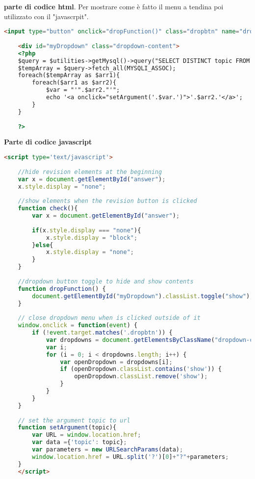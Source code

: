 \textbf{parte di codice html}. Per mostrare come è fatto il menu a tendina poi utilizzato con il "javascrpit".\\

\begin{lstlisting}[language=html]
	 <input type="button" onclick="dropFunction()" class="dropbtn" name="dropdown" value="Seleziona capitolo">
	
	<div id="myDropdown" class="dropdown-content">
	<?php
	$query = $utilities->getMysql()->query("SELECT DISTINCT topic FROM charting_test_5d");
	$tempArray = $query->fetch_all(MYSQLI_ASSOC);
	foreach($tempArray as $arr1){
		foreach($arr1 as $arr2){
			$var = "'".$arr2."'";
			echo '<a onclick="setArgument('.$var.')">'.$arr2.'</a>';
		}
	}		
	
	?>			
\end{lstlisting}

\textbf{Parte di codice javascript}\\

\begin{lstlisting}[language=html]
	<script type='text/javascript'>
	
	//hide revision elements at the beginning
	var x = document.getElementById("answer");
	x.style.display = "none";
	
	//show elements when the revision button is clicked
	function check(){
		var x = document.getElementById("answer");
		
		if(x.style.display === "none"){
			x.style.display = "block";
		}else{
			x.style.display = "none";
		}	
	}
	
	//dropdown button toggle to hide and show contents
	function dropFunction() {
		document.getElementById("myDropdown").classList.toggle("show");
	}
	
	// close dropdown menu when is clicked outside of it
	window.onclick = function(event) {
		if (!event.target.matches('.dropbtn')) {
			var dropdowns = document.getElementsByClassName("dropdown-content");
			var i;
			for (i = 0; i < dropdowns.length; i++) {
				var openDropdown = dropdowns[i];
				if (openDropdown.classList.contains('show')) {
					openDropdown.classList.remove('show');
				}
			}
		}
	}
	
	// set the argument topic to url
	function setArgument(topic){
		var URL = window.location.href;
		var data ={'topic': topic};
		var parameters = new URLSearchParams(data);
		window.location.href = URL.split('?')[0]+"?"+parameters;
	}
	</script>
\end{lstlisting}

